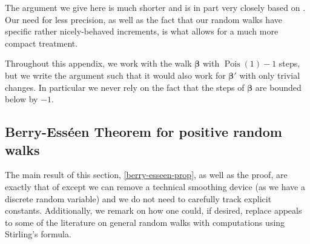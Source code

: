 \documentclass[11pt,reqno]{amsart}
\numberwithin{equation}{section}
\theoremstyle{definition}
\theoremstyle{remark}
\newcommand\Pois{\operatorname{Pois}}
\def\boldbeta{\boldsymbol\beta}
\begin{document}
The argument we give here is much shorter and is in part very closely based on \cite{DTW-berry-esseen}. Our need for less precision, as well as the fact that our random walks have specific rather nicely-behaved increments, is what allows for a much more compact treatment.

Throughout this appendix, we work with the walk $\boldbeta$ with $\Pois(1) - 1$ steps, but we write the argument such that it would also work for $\boldbeta'$ with only trivial changes. In particular we never rely on the fact that the steps of $\boldbeta$ are bounded below by $-1$.

\subsection{Berry-Ess\'een Theorem for positive random walks} The main result of this section, \cref{berry-esseen-prop}, as well as the proof, are exactly that of \cite{DTW-berry-esseen} except we can remove a technical smoothing device (as we have a discrete random variable) and we do not need to carefully track explicit constants. Additionally, we remark on how one could, if desired, replace appeals to some of the literature on general random walks with computations using Stirling's formula.
\end{document}

